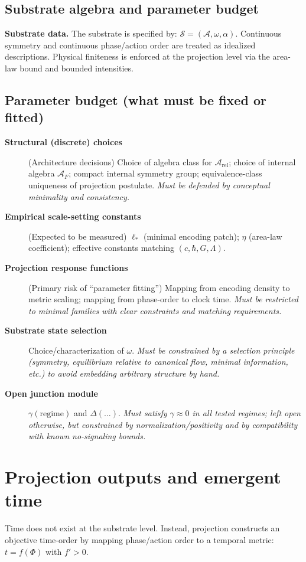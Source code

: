 \documentclass[reprint, amsmath, amssymb, aps, prd]{revtex4-2}
\begin{document}
\subsection{Substrate algebra and parameter budget}
\textbf{Substrate data.} The substrate is specified by: $\mathcal{S} = (\mathcal{A}, \omega, \alpha)$. Continuous symmetry and continuous phase/action order are treated as idealized descriptions. Physical finiteness is enforced at the projection level via the area-law bound and bounded intensities.

\subsection{Parameter budget (what must be fixed or fitted)}
\begin{description}
    \item[\textbf{Structural (discrete) choices}] (Architecture decisions) Choice of algebra class for $\mathcal{A}_{\text{rel}}$; choice of internal algebra $\mathcal{A}_F$; compact internal symmetry group; equivalence-class uniqueness of projection postulate. \textit{Must be defended by conceptual minimality and consistency.}
    \item[\textbf{Empirical scale-setting constants}] (Expected to be measured) $\ell_*$ (minimal encoding patch); $\eta$ (area-law coefficient); effective constants matching $(c, \hbar, G, \Lambda)$. 
    \item[\textbf{Projection response functions}] (Primary risk of ``parameter fitting'') Mapping from encoding density to metric scaling; mapping from phase-order to clock time. \textit{Must be restricted to minimal families with clear constraints and matching requirements.}
    \item[\textbf{Substrate state selection}] Choice/characterization of $\omega$. \textit{Must be constrained by a selection principle (symmetry, equilibrium relative to canonical flow, minimal information, etc.) to avoid embedding arbitrary structure by hand.}
    \item[\textbf{Open junction module}] $\gamma(\text{regime})$ and $\Delta(\ldots)$. \textit{Must satisfy $\gamma \approx 0$ in all tested regimes; left open otherwise, but constrained by normalization/positivity and by compatibility with known no-signaling bounds.}
\end{description}

\section{Projection outputs and emergent time}
Time does not exist at the substrate level. Instead, projection constructs an objective time-order by mapping phase/action order to a temporal metric: $t = f(\Phi)$ with $f' > 0$.
\end{document}
